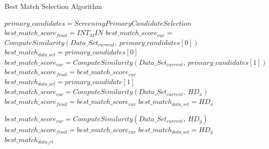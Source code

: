 
 
\begin{algorithm}
\caption{Best Match Selection Algorithm}
\label{best_match_selection}
\fontsize{10}{15}
\begin{algorithmic}[1]
\State $primary\_candidates = Screening$\textendash$PrimaryCandidateSelection$
\State $best\_match\_score_{final} = INT_MIN$
\State $best\_match\_score_{cur}$ = $ComputeSimilarity(Data\_Set_{current},\ primary\_candidates[0])$
\State $best\_match_{data\_set} = primary\_candidates[0]$
\State $best\_match\_score_{cur}= ComputeSimilarity(Data\_Set_{current},\ primary\_candidates[1])$
	\State $best\_match\_score_{final} = best\_match\_score_{cur}$
	\State $best\_match_{data\_set} = primary\_candidate[1]$
\EndIf
{} 
	\State $best\_match\_score_{cur} = ComputeSimilarity(Data\_Set_{current},\ HD_x)$
		\State $best\_match\_score_{final} = best\_match\_score_{cur}$
		\State $best\_match_{data\_set} = HD_x$
	\EndIf
\EndFor

	\State $best\_match\_score_{cur} = ComputeSimilarity(Data\_Set_{current},\ HD_y)$
		\State $best\_match\_score_{final} = best\_match\_score_{cur}$
		\State $best\_match_{data\_set} = HD_y$
	\EndIf
\EndFor
\Return  $best\_match_{data_set}$
\EndProcedure
\end{algorithmic}
\end{algorithm}



